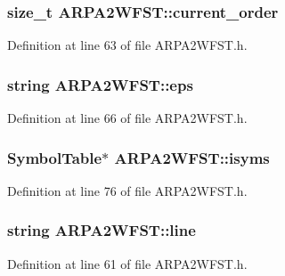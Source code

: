 \subsubsection[{current\+\_\+order}]{\setlength{\rightskip}{0pt plus 5cm}size\+\_\+t A\+R\+P\+A2\+W\+F\+S\+T\+::current\+\_\+order}\hypertarget{class_a_r_p_a2_w_f_s_t_a0aff74ebbb5ca7329772a5f14fec14fe}{}\label{class_a_r_p_a2_w_f_s_t_a0aff74ebbb5ca7329772a5f14fec14fe}


Definition at line 63 of file A\+R\+P\+A2\+W\+F\+S\+T.\+h.

\subsubsection[{eps}]{\setlength{\rightskip}{0pt plus 5cm}string A\+R\+P\+A2\+W\+F\+S\+T\+::eps}\hypertarget{class_a_r_p_a2_w_f_s_t_ac3c171a25b4f9cee7a2977301af868ce}{}\label{class_a_r_p_a2_w_f_s_t_ac3c171a25b4f9cee7a2977301af868ce}


Definition at line 66 of file A\+R\+P\+A2\+W\+F\+S\+T.\+h.

\subsubsection[{isyms}]{\setlength{\rightskip}{0pt plus 5cm}Symbol\+Table$\ast$ A\+R\+P\+A2\+W\+F\+S\+T\+::isyms}\hypertarget{class_a_r_p_a2_w_f_s_t_acfefd0129935a85fc424811a7d3627d3}{}\label{class_a_r_p_a2_w_f_s_t_acfefd0129935a85fc424811a7d3627d3}


Definition at line 76 of file A\+R\+P\+A2\+W\+F\+S\+T.\+h.

\subsubsection[{line}]{\setlength{\rightskip}{0pt plus 5cm}string A\+R\+P\+A2\+W\+F\+S\+T\+::line}\hypertarget{class_a_r_p_a2_w_f_s_t_a80673879d80fa9d9f06707e2e4f3c6f5}{}\label{class_a_r_p_a2_w_f_s_t_a80673879d80fa9d9f06707e2e4f3c6f5}


Definition at line 61 of file A\+R\+P\+A2\+W\+F\+S\+T.\+h.

